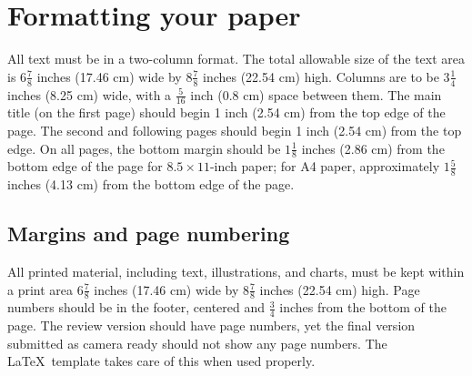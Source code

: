 \documentclass[10pt,twocolumn,letterpaper]{article}
\begin{document}


\section{Formatting your paper}
\label{sec:formatting}

All text must be in a two-column format.
The total allowable size of the text area is $6\frac78$ inches (17.46 cm) wide by $8\frac78$ inches (22.54 cm) high.
Columns are to be $3\frac14$ inches (8.25 cm) wide, with a $\frac{5}{16}$ inch (0.8 cm) space between them.
The main title (on the first page) should begin 1 inch (2.54 cm) from the top edge of the page.
The second and following pages should begin 1 inch (2.54 cm) from the top edge.
On all pages, the bottom margin should be $1\frac{1}{8}$ inches (2.86 cm) from the bottom edge of the page for $8.5 \times 11$-inch paper;
for A4 paper, approximately $1\frac{5}{8}$ inches (4.13 cm) from the bottom edge of the
page.

\subsection{Margins and page numbering}

All printed material, including text, illustrations, and charts, must be kept
within a print area $6\frac{7}{8}$ inches (17.46 cm) wide by $8\frac{7}{8}$ inches (22.54 cm)
high.
%
Page numbers should be in the footer, centered and $\frac{3}{4}$ inches from the bottom of the page.
The review version should have page numbers, yet the final version submitted as camera ready should not show any page numbers.
The \LaTeX\ template takes care of this when used properly.
\end{document}
